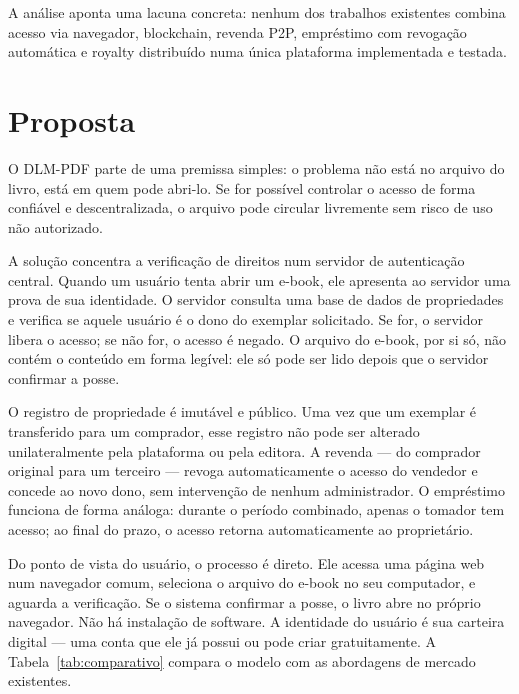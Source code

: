 \documentclass[12pt]{article}
\begin{document}
A análise aponta uma lacuna concreta: nenhum dos trabalhos existentes combina acesso via navegador, blockchain, revenda P2P, empréstimo com revogação automática e royalty distribuído numa única plataforma implementada e testada.

\section{Proposta}

O DLM-PDF parte de uma premissa simples: o problema não está no arquivo do livro, está em quem pode abri-lo. Se for possível controlar o acesso de forma confiável e descentralizada, o arquivo pode circular livremente sem risco de uso não autorizado.

A solução concentra a verificação de direitos num servidor de autenticação central. Quando um usuário tenta abrir um e-book, ele apresenta ao servidor uma prova de sua identidade. O servidor consulta uma base de dados de propriedades e verifica se aquele usuário é o dono do exemplar solicitado. Se for, o servidor libera o acesso; se não for, o acesso é negado. O arquivo do e-book, por si só, não contém o conteúdo em forma legível: ele só pode ser lido depois que o servidor confirmar a posse.

O registro de propriedade é imutável e público. Uma vez que um exemplar é transferido para um comprador, esse registro não pode ser alterado unilateralmente pela plataforma ou pela editora. A revenda — do comprador original para um terceiro — revoga automaticamente o acesso do vendedor e concede ao novo dono, sem intervenção de nenhum administrador. O empréstimo funciona de forma análoga: durante o período combinado, apenas o tomador tem acesso; ao final do prazo, o acesso retorna automaticamente ao proprietário.

Do ponto de vista do usuário, o processo é direto. Ele acessa uma página web num navegador comum, seleciona o arquivo do e-book no seu computador, e aguarda a verificação. Se o sistema confirmar a posse, o livro abre no próprio navegador. Não há instalação de software. A identidade do usuário é sua carteira digital — uma conta que ele já possui ou pode criar gratuitamente. A Tabela~\ref{tab:comparativo} compara o modelo com as abordagens de mercado existentes.
\end{document}

